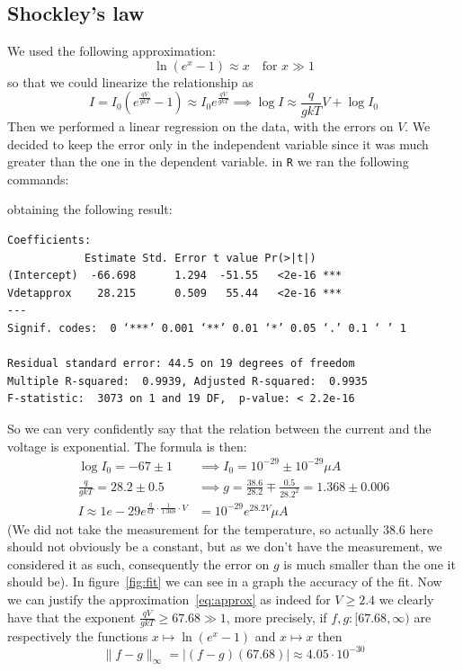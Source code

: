 \documentclass[notitlepage]{report}
\numberwithin{equation}{section}
\theoremstyle{plain}
\theoremstyle{definition}
\theoremstyle{remark}
\begin{document}
   \subsection{Shockley's law}
    We used the following approximation:
    \begin{equation}\label{eq:approx}
        \ln {(e^{x} - 1)} \approx x \quad \text{for } x \gg 1
    \end{equation}
    so that we could linearize the relationship as
    \[
        I = I_0 \left( e^{\frac{qV}{gkT}} - 1 \right) \approx I_0
        e^{\frac{qV}{gkT}} \implies \log I \approx \frac{q}{gkT} V + \log I_{0}
    \]
    Then we performed a linear regression on the data, with the errors on \(V\).
    We decided to keep the error only in the independent variable since it was
    much greater than the one in the dependent variable. 
   in \texttt{R} we ran the following commands:

   obtaining the following result:
   \begin{verbatim}
Coefficients:
            Estimate Std. Error t value Pr(>|t|)    
(Intercept)  -66.698      1.294  -51.55   <2e-16 ***
Vdetapprox    28.215      0.509   55.44   <2e-16 ***
---
Signif. codes:  0 ‘***’ 0.001 ‘**’ 0.01 ‘*’ 0.05 ‘.’ 0.1 ‘ ’ 1

Residual standard error: 44.5 on 19 degrees of freedom
Multiple R-squared:  0.9939, Adjusted R-squared:  0.9935 
F-statistic:  3073 on 1 and 19 DF,  p-value: < 2.2e-16  
   \end{verbatim}
   So we can very confidently say that the relation between the current and the
   voltage is exponential. The formula is then:
   \begin{align*}
       \log I_{0} = -67 \pm 1 &\implies I_{0} = 10^{-29} \pm 
       10^{-29} \mu A\\
       \frac{q}{gkT} = 28.2 \pm 0.5 &\implies g = \frac{38.6}{28.2} \mp
       \frac{0.5}{28.2^2} = 1.368 \pm 0.006\\
       I \approx 1e-29 e^{\frac{q}{kT} \cdot \frac{1}{1.368} \cdot V} &= 10^{-29}
       e^{28.2 V} \mu A
   \end{align*}
   (We did not take the measurement for the temperature, so actually 38.6 here
   should not obviously be a constant, but as we don't have the measurement, we
   considered it as such, consequently the error on \(g\) is much smaller than
   the one it should be).
   In figure~\ref{fig:fit} we can see in a graph the accuracy of the fit. Now we
   can justify the approximation~\eqref{eq:approx} as indeed for \(V \ge 2.4\)
   we clearly have that the exponent \(\frac{qV}{gkT} \ge 67.68 \gg 1\), more
   precisely, if \(f, g: [67.68, \infty)\) are respectively the functions \(x
   \mapsto \ln {(e^{x} - 1)}\) and \(x \mapsto x\) then
   \[
       \|f - g\|_{\infty} = |{(f - g)}{(67.68)}| \approx 4.05 \cdot 10^{-30}
   \]
\end{document}
